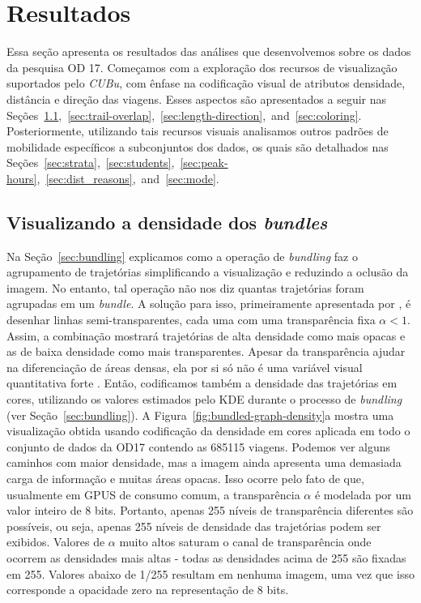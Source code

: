 \chapter{Resultados}
\label{sec:results}

Essa seção apresenta os resultados das análises que desenvolvemos sobre os dados
da pesquisa OD 17. Começamos com a exploração dos recursos de visualização
suportados pelo \emph{CUBu}, com ênfase na codificação visual de atributos
densidade, distância e direção das viagens. Esses aspectos são apresentados a
seguir nas Seções~\ref{sec:density},~\ref{sec:trail-overlap},~\ref{sec:length-direction},~and~\ref{sec:coloring}.
Posteriormente, utilizando tais recursos visuais analisamos outros padrões de
mobilidade específicos a subconjuntos dos dados, os quais são detalhados nas
Seções~\ref{sec:strata},~\ref{sec:students},~\ref{sec:peak-hours},~\ref{sec:dist_reasons},~and~\ref{sec:mode}.

\section{Visualizando a densidade dos \emph{bundles}}
\label{sec:density}

Na Seção~\ref{sec:bundling} explicamos como a operação de \emph{bundling}
faz o agrupamento de trajetórias simplificando a visualização e reduzindo a oclusão
da imagem. No entanto, tal operação não nos diz quantas trajetórias foram agrupadas em
um \emph{bundle}. A solução para isso, primeiramente apresentada por \citet{holten06},
é desenhar linhas semi-transparentes, cada uma com uma transparência fixa $\alpha < 1$.
Assim, a combinação mostrará trajetórias de alta densidade como mais opacas e as de baixa
densidade como mais transparentes. Apesar da transparência ajudar na diferenciação
de áreas densas, ela por si só não é uma variável visual quantitativa forte \citep{slocum09}.
Então, codificamos também a densidade das trajetórias em cores, utilizando
os valores estimados pelo KDE durante o processo de \emph{bundling} (ver Seção~\ref{sec:bundling}).
A Figura~\ref{fig:bundled-graph-density}a mostra uma visualização obtida usando codificação
da densidade em cores aplicada em todo o conjunto de dados da OD17 contendo
as \num{685115} viagens. Podemos ver alguns caminhos com maior densidade, mas a imagem
ainda apresenta uma demasiada carga de informação e muitas áreas opacas. Isso ocorre pelo fato de que,
usualmente em GPUS de consumo comum, a transparência $\alpha$ é modelada por um valor
inteiro de 8 bits. Portanto, apenas 255 níveis de transparência diferentes são possíveis,
ou seja, apenas 255 níveis de densidade das trajetórias podem ser exibidos. Valores
de $\alpha$ muito altos saturam o canal de transparência
onde ocorrem as densidades mais altas - todas as densidades acima de 255 são fixadas
em 255. Valores abaixo de 1/255 resultam em nenhuma imagem, uma vez que
isso corresponde a opacidade zero na representação de 8 bits.

